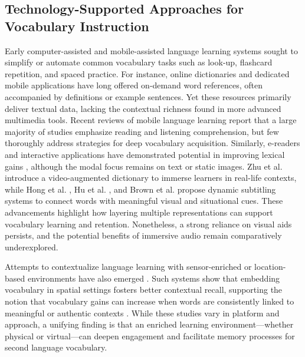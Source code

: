 \documentclass{ehissymp}
\begin{document}
\subsection{Technology-Supported Approaches for Vocabulary Instruction}
Early computer-assisted and mobile-assisted language learning systems sought to simplify or automate common vocabulary tasks such as look-up, flashcard repetition, and spaced practice. For instance, online dictionaries \cite{Weblio2005,Goo1999,americanheritage1969,oxford1948} and dedicated mobile applications \cite{mikan2014,SmartLanguageApps2015,moetan2008} have long offered on-demand word references, often accompanied by definitions or example sentences. Yet these resources primarily deliver textual data, lacking the contextual richness found in more advanced multimedia tools. Recent reviews of mobile language learning \cite{HwangWu2014,HwangFu2019} report that a large majority of studies emphasize reading and listening comprehension, but few thoroughly address strategies for deep vocabulary acquisition. Similarly, e-readers and interactive applications have demonstrated potential in improving lexical gains \cite{wright2013}, although the modal focus remains on text or static images. Zhu et al.\cite{Zhu2017} introduce a video-augmented dictionary to immerse learners in real-life contexts, while Hong et al. \cite{Hong2010}, Hu et al. \cite{Hu2015}, and Brown et al. \cite{Brown2015} propose dynamic subtitling systems to connect words with meaningful visual and situational cues. These advancements highlight how layering multiple representations can support vocabulary learning and retention. Nonetheless, a strong reliance on visual aids persists, and the potential benefits of immersive audio remain comparatively underexplored.

Attempts to contextualize language learning with sensor-enriched or location-based environments have also emerged \cite{Nishida2005,Hautasaari2020}. Such systems show that embedding vocabulary in spatial settings fosters better contextual recall, supporting the notion that vocabulary gains can increase when words are consistently linked to meaningful or authentic contexts \cite{Dearman2012,AlMekhlafi2009,Ogata2004,VocaBra}. While these studies vary in platform and approach, a unifying finding is that an enriched learning environment—whether physical or virtual—can deepen engagement and facilitate memory processes for second language vocabulary.
\end{document}
